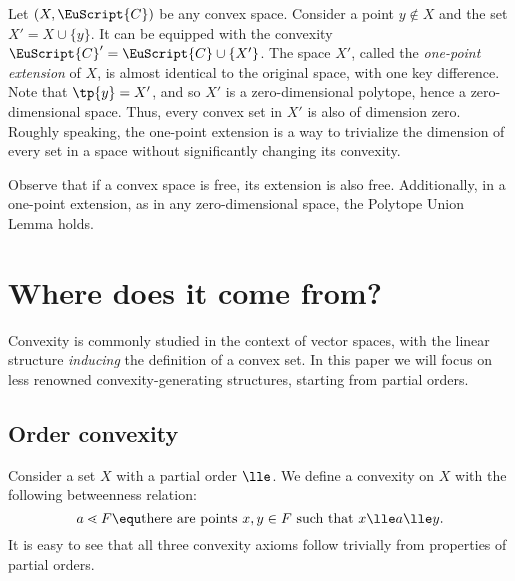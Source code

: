 \documentclass[12pt, a4paper]{article}
\newcommand{\C}{\EuScript{C}}
\newcommand{\btw}{\lessdot}
\begin{document}
\begin{definition}\label{def-0-dim-ext}
    Let \((X, \C)\) be any convex space. Consider a point \(y \nin X\) and the set \(X' = X \cup \{y\}\). It can be equipped with the convexity \(\C' = \C \cup \{X'\}\). The space \(X'\), called the \textit{one-point extension} of \(X\), is almost identical to the original space, with one key difference. Note that \(\tp{y} = X'\), and so \(X'\) is a zero-dimensional polytope, hence a zero-dimensional space. Thus, every convex set in \(X'\) is also of dimension zero. Roughly speaking, the one-point extension is a way to trivialize the dimension of every set in a space without significantly changing its convexity.
\end{definition}

\begin{remark}
    Observe that if a convex space is free, its extension is also free. Additionally, in a one-point extension, as in any zero-dimensional space, the Polytope Union Lemma holds.
\end{remark}

















\section{Where does it come from?}

Convexity is commonly studied in the context of vector spaces, with the linear structure \textit{inducing} the definition of a convex set. In this paper we will focus on less renowned convexity-generating structures, starting from partial orders.

\subsection{Order convexity}\label{order}

\begin{definition}\label{def-ord-conv}
    Consider a set \(X\) with a partial order \(\lle\). We define a convexity on \(X\) with the following betweenness relation: \[a \btw F \equ \mbox{there are points } x, y \in F \mbox{ such that } x \lle a \lle y.\] It is easy to see that all three convexity axioms follow trivially from properties of partial orders.
\end{definition}
\end{document}
